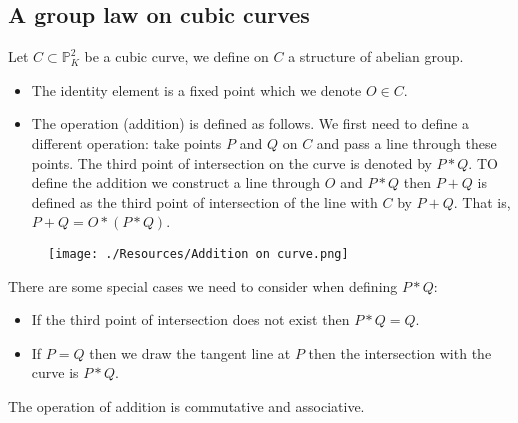 \documentclass[12pt, a4paper]{article}
\newcommand{\PP}{\mathbb P}
\begin{document}
\subsection{A group law on cubic curves}

Let \(C \subset \PP^2_K\) be a cubic curve, we define on \(C\) a structure of abelian group.
\begin{itemize}
    \item The identity element is a fixed point which we denote \(O \in C\). 
    \item The operation (addition) is defined as follows. We first need to define a different operation: take points \(P\) and \(Q\) on \(C\) and pass a line through these points. The third point of intersection on the curve is denoted by \(P*Q\). TO define the addition we construct a line through \(O\) and \(P*Q\) then \(P+Q\) is defined as the third point of intersection of the line with \(C\) by \(P+Q\). That is, \(P+Q = O*(P*Q)\). 
\end{itemize}

\begin{figure}[H]
     \begin{center}
         \texttt{[image: ./Resources/Addition on curve.png]}
     \end{center}
\end{figure}

There are some special cases we need to consider when defining \(P*Q\):
\begin{itemize}
    \item If the third point of intersection does not exist then \(P*Q=Q\).
    \item If \(P=Q\) then we draw the tangent line at \(P\) then the intersection with the curve is \(P*Q\).
\end{itemize}

\begin{mdlemma}
    The operation of addition is commutative and associative.
\end{mdlemma}
\end{document}
